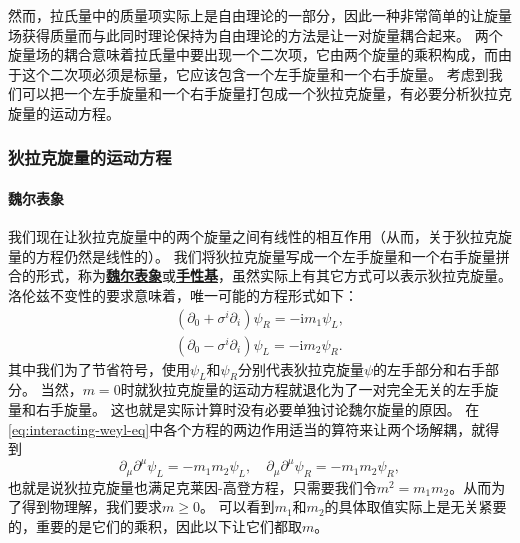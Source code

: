 \documentclass[hyperref, UTF8, a4paper]{ctexart}
\newcommand*{\ii}{\mathrm{i}}
\newcommand{\concept}[1]{\underline{\textbf{#1}}}
\begin{document}
然而，拉氏量中的质量项实际上是自由理论的一部分，因此一种非常简单的让旋量场获得质量而与此同时理论保持为自由理论的方法是让一对旋量耦合起来。
两个旋量场的耦合意味着拉氏量中要出现一个二次项，它由两个旋量的乘积构成，而由于这个二次项必须是标量，它应该包含一个左手旋量和一个右手旋量。
考虑到我们可以把一个左手旋量和一个右手旋量打包成一个狄拉克旋量，有必要分析狄拉克旋量的运动方程。

\subsubsection{狄拉克旋量的运动方程} 

\paragraph{魏尔表象} 我们现在让狄拉克旋量中的两个旋量之间有线性的相互作用（从而，关于狄拉克旋量的方程仍然是线性的）。
我们将狄拉克旋量写成一个左手旋量和一个右手旋量拼合的形式，称为\concept{魏尔表象}或\concept{手性基}，虽然实际上有其它方式可以表示狄拉克旋量。
洛伦兹不变性的要求意味着，唯一可能的方程形式如下：
\begin{equation}
    \begin{aligned}
        (\partial_0 + \sigma^i \partial_i) \psi_R = - \ii m_1 \psi_L, \\
        (\partial_0 - \sigma^i \partial_i) \psi_L = - \ii m_2 \psi_R.
    \end{aligned}
    \label{eq:interacting-weyl-eq}
\end{equation}
其中我们为了节省符号，使用$\psi_L$和$\psi_R$分别代表狄拉克旋量$\psi$的左手部分和右手部分。
当然，$m=0$时就狄拉克旋量的运动方程就退化为了一对完全无关的左手旋量和右手旋量。
这也就是实际计算时没有必要单独讨论魏尔旋量的原因。
在\eqref{eq:interacting-weyl-eq}中各个方程的两边作用适当的算符来让两个场解耦，就得到
\[
    \partial_\mu \partial^\mu \psi_L = - m_1 m_2 \psi_L, \quad \partial_\mu \partial^\mu \psi_R = - m_1 m_2 \psi_R,
\]
也就是说狄拉克旋量也满足克莱因-高登方程，只需要我们令$m^2=m_1 m_2$。从而为了得到物理解，我们要求$m \geq 0$。
可以看到$m_1$和$m_2$的具体取值实际上是无关紧要的，重要的是它们的乘积，因此以下让它们都取$m$。
\end{document}
